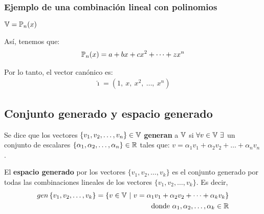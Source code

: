 \begin{note}
\end{note}

\subsubsection{Ejemplo de una combinación lineal con polinomios}
\label{sec:ejemplo_de_una_combinacion_lineal_con_polinomios}

\begin{center}
    $\mathbb{V} = \mathbb{P}_n(x)$
\end{center}

\begin{note}
\end{note}

Así, tenemos que:
\begin{align*}
    \mathbb{P}_n(x) = a + b x + c x^2 + \dots + z x^n
\end{align*}

Por lo tanto, el vector canónico es:
\begin{align*}
    \hat{\imath} = \left( 1, \ x, \ x^2, \ \dots, \ x^n \right)
\end{align*}

\subsection{Conjunto generado y espacio generado}
\label{sec:conjunto_generado_y_espacio_generado}

\begin{definition}
{
    Se dice que los vectores $\{ v_1, v_2, \dots, v_n \} \in \mathbb{V}$ \textbf{generan} a $\mathbb{V}$ si $\forall v \in \mathbb{V} \ \exists$ un conjunto de escalares $\{ \alpha_1, \alpha_2, \dots, \alpha_n \} \in \mathbb{R}$ tales que: $v = \alpha_1 v_1 + \alpha_2 v_2 + \dots + \alpha_n v_n$.
}   
\end{definition}

\begin{definition}
{
    El \textbf{espacio generado} por los vectores $\{ v_1, v_2, \dots, v_k \}$ es el conjunto generado por todas las combinaciones lineales de los vectores $\{ v_1, v_2, \dots, v_k \}$. Es decir,
    \begin{align*}
        gen \left\{ v_1, v_2, \dots, v_k \right\} = \left\{ v \in \V \ \middle| \ v = \alpha_1 v_1 + \alpha_2 v_2 + \dots + \alpha_k v_k \right\} \\
        \text{donde} \ \alpha_1, \alpha_2, \dots, \alpha_k \in \R
    \end{align*}
}
\end{definition}

